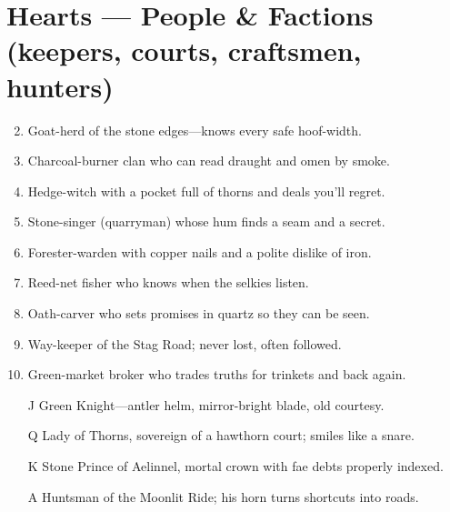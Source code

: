 \section*{Hearts --- People \& Factions (keepers, courts, craftsmen, hunters)}
\begin{enumerate}
\setcounter{enumi}{1}
\item Goat-herd of the stone edges---knows every safe hoof-width.
\item Charcoal-burner clan who can read draught and omen by smoke.
\item Hedge-witch with a pocket full of thorns and deals you'll regret.
\item Stone-singer (quarryman) whose hum finds a seam and a secret.
\item Forester-warden with copper nails and a polite dislike of iron.
\item Reed-net fisher who knows when the selkies listen.
\item Oath-carver who sets promises in quartz so they can be seen.
\item Way-keeper of the Stag Road; never lost, often followed.
\item Green-market broker who trades truths for trinkets and back again.
\item[J] Green Knight---antler helm, mirror-bright blade, old courtesy.
\item[Q] Lady of Thorns, sovereign of a hawthorn court; smiles like a snare.
\item[K] Stone Prince of Aelinnel, mortal crown with fae debts properly indexed.
\item[A] Huntsman of the Moonlit Ride; his horn turns shortcuts into roads.
\end{enumerate}

